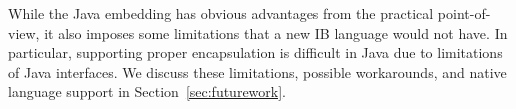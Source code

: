 
\begin{comment}
To evaluate the usefulness of object interfaces, we illustrate
\numOfCaseStudies \bruno{needs updates}\yanlin{updated} 
applications. The first application is a simple 
solution to the Expression Problem~\cite{wadler98expression}, supporting independent 
extensibility~\cite{zenger05independentlyextensible}, and without boilerplate code. The second
application shows how embedded DSLs using fluent interfaces~\cite{fowler2005fluentinterface} 
can be easily defined using object interfaces. The third
application is a case study for a simple Maze game implemented with 
multiple inheritance. For this application we show that there is a
significant reduction in the number of lines of code when compared 
to an existing implementation~\cite{bono14} using plain Java 8. The last
application is a relatively larger case study of refactoring of a simple interpreter, showing that our
approach can benefit modularity and scale to real code base. Noteworthy, the first three applications are implemented 
without defining a single class! The last one contains several classes that cannot be 
converted to interfaces due to the limitation of our implementation of \mixin.
\end{comment}

While the Java embedding has obvious advantages from the practical
point-of-view, it also imposes some limitations that a new IB language
would not have. In particular, supporting proper encapsulation is
difficult in Java due to limitations of Java interfaces. We discuss
these limitations, possible workarounds, and native language support in Section~\ref{sec:futurework}.

